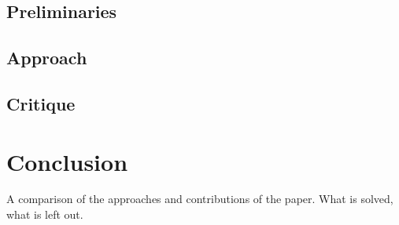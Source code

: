 \documentclass[12pt]{article}
\begin{document}
\subsection{Preliminaries}

\subsection{Approach}

\subsection{Critique}

\section{Conclusion}

A comparison of the approaches and contributions of the paper.
What is solved, what is left out.



\end{document}
